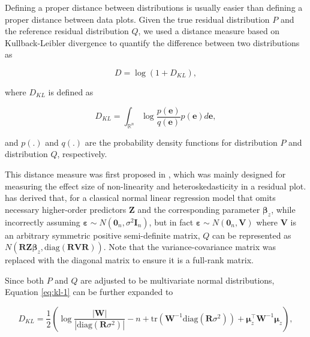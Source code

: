 \documentclass[]{interact}
\theoremstyle{plain}%
\theoremstyle{definition}
\theoremstyle{remark}
\begin{document}
Defining a proper distance between distributions is usually easier than
defining a proper distance between data plots. Given the true residual
distribution \(P\) and the reference residual distribution \(Q\), we
used a distance measure based on Kullback-Leibler divergence
\citep{kullback1951information} to quantify the difference between two
distributions as

\begin{equation} \label{eq:kl-0}
D = \log\left(1 + D_{KL}\right),
\end{equation}

where \(D_{KL}\) is defined as

\begin{equation} \label{eq:kl-1}
D_{KL} = \int_{\mathbb{R}^{n}}\log\frac{p(\boldsymbol{e})}{q(\boldsymbol{e})}p(\boldsymbol{e})d\boldsymbol{e},
\end{equation}

\noindent and \(p(.)\) and \(q(.)\) are the probability density
functions for distribution \(P\) and distribution \(Q\), respectively.

This distance measure was first proposed in \citet{li2024plot}, which
was mainly designed for measuring the effect size of non-linearity and
heteroskedasticity in a residual plot. \citet{li2024plot} has derived
that, for a classical normal linear regression model that omits
necessary higher-order predictors \(\boldsymbol{Z}\) and the
corresponding parameter \(\boldsymbol{\beta}_z\), while incorrectly
assuming
\(\boldsymbol{\varepsilon} \sim N(\boldsymbol{0}_n,\sigma^2\boldsymbol{I}_n)\),
but in fact
\(\boldsymbol{\varepsilon} \sim N(\boldsymbol{0}_n, \boldsymbol{V})\)
where \(\boldsymbol{V}\) is an arbitrary symmetric positive
semi-definite matrix, \(Q\) can be represented as
\(N(\boldsymbol{R}\boldsymbol{Z}\boldsymbol{\beta}_z, \text{diag}(\boldsymbol{R}\boldsymbol{V}\boldsymbol{R}))\).
Note that the variance-covariance matrix was replaced with the diagonal
matrix to ensure it is a full-rank matrix.

Since both \(P\) and \(Q\) are adjusted to be multivariate normal
distributions, Equation \ref{eq:kl-1} can be further expanded to

\begin{equation} \label{eq:kl-2}
D_{KL} = \frac{1}{2}\left(\log\frac{|\boldsymbol{W}|}{|\text{diag}(\boldsymbol{R}\sigma^2)|} - n + \text{tr}(\boldsymbol{W}^{-1}\text{diag}(\boldsymbol{R}\sigma^2)) + \boldsymbol{\mu}_z^\top\boldsymbol{W}^{-1}\boldsymbol{\mu}_z\right),
\end{equation}
\end{document}
